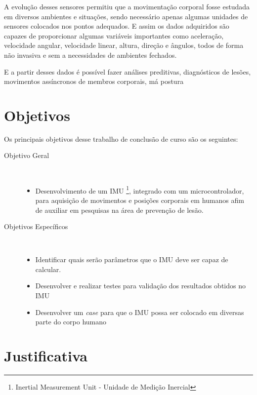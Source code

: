 A evolução desses sensores permitiu que a movimentação corporal fosse estudada em diversos ambientes e situações, sendo necessário apenas algumas unidades de sensores colocados nos pontos adequados. E assim os dados adquiridos são capazes de proporcionar algumas variáveis importantes como aceleração, velocidade angular, velocidade linear, altura, direção e ângulos, todos de forma não invasiva
e sem a necessidades de ambientes fechados\cite{chang2016}.

E a partir desses dados é possível fazer análises preditivas, diagnósticos de lesões, movimentos assíncronos de membros corporais, má postura 



\section{Objetivos}

Os principais objetivos desse trabalho de conclusão de curso são os seguintes:

\begin{description}
	\item [Objetivo Geral] \
	
	\begin{itemize}
		\item Desenvolvimento de um IMU \footnote{Inertial Measurement Unit - Unidade de Medição Inercial}, integrado com um microcontrolador, para aquisição de movimentos e posições corporais em humanos afim de auxiliar em pesquisas na área de prevenção de lesão.
	\end{itemize}
		
	\item [Objetivos Específicos] \
	\begin{itemize} 
		\item Identificar quais serão parâmetros que o IMU deve ser capaz de calcular. 
		
		\item Desenvolver e realizar testes para validação dos resultados obtidos no IMU
		
		\item Desenvolver um \textit{case} para que o IMU possa ser colocado em diversas parte do corpo humano
		
		
	\end{itemize}
\end{description}

\section{Justificativa}

